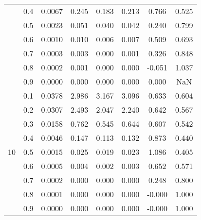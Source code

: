 \documentclass[11pt,a4paper]{report}
\begin{document}
\begin{longtable}{ | c | c || c | c | c | c | c | c | }
 & 0.4 & 0.0067 & 0.245 & 0.183 & 0.213 & 0.766 & 0.525 \\
 & 0.5 & 0.0023 & 0.051 & 0.040 & 0.042 & 0.240 & 0.799 \\
 & 0.6 & 0.0010 & 0.010 & 0.006 & 0.007 & 0.509 & 0.693 \\
 & 0.7 & 0.0003 & 0.003 & 0.000 & 0.001 & 0.326 & 0.848 \\
 & 0.8 & 0.0002 & 0.001 & 0.000 & 0.000 & -0.051 & 1.037 \\
 & 0.9 & 0.0000 & 0.000 & 0.000 & 0.000 & 0.000 & NaN \\
 \hline
\multirow{9}{*}{10} & 0.1 & 0.0378 & 2.986 & 3.167 & 3.096 & 0.633 & 0.604 \\
 & 0.2 & 0.0307 & 2.493 & 2.047 & 2.240 & 0.642 & 0.567 \\
 & 0.3 & 0.0158 & 0.762 & 0.545 & 0.644 & 0.607 & 0.542 \\
 & 0.4 & 0.0046 & 0.147 & 0.113 & 0.132 & 0.873 & 0.440 \\
 & 0.5 & 0.0015 & 0.025 & 0.019 & 0.023 & 1.086 & 0.405 \\
 & 0.6 & 0.0005 & 0.004 & 0.002 & 0.003 & 0.652 & 0.571 \\
 & 0.7 & 0.0002 & 0.000 & 0.000 & 0.000 & 0.248 & 0.800 \\
 & 0.8 & 0.0001 & 0.000 & 0.000 & 0.000 & -0.000 & 1.000 \\
 & 0.9 & 0.0000 & 0.000 & 0.000 & 0.000 & -0.000 & 1.000 \\
 \hline
\hline
\end{longtable}
\end{document}

